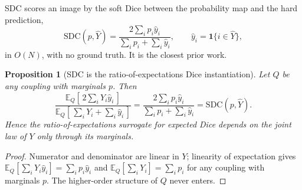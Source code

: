 \documentclass[11pt]{article}
\newtheorem{proposition}{Proposition}
\theoremstyle{remark}
\newcommand{\Yhat}{\widehat{Y}}
\newcommand{\SDC}{\mathrm{SDC}}
\newcommand{\Ex}{\mathbb{E}}
\begin{document}
SDC \cite{sdc} scores an image by the soft Dice between the probability map and the
hard prediction,
\begin{equation}\label{eq:sdc}
\SDC(p,\Yhat) = \frac{2\sum_i p_i \hat{y}_i}{\sum_i p_i + \sum_i \hat{y}_i},
\qquad \hat{y}_i = \mathbf{1}\{i\in\Yhat\},
\end{equation}
in $O(N)$, with no ground truth. It is the closest prior work.

\begin{proposition}[SDC is the ratio-of-expectations Dice instantiation]\label{prop:sdc}
Let $Q$ be \emph{any} coupling with marginals $p$. Then
\begin{equation}
\frac{\Ex_Q[\,2\sum_i Y_i\hat y_i\,]}{\Ex_Q[\,\sum_i Y_i + \sum_i \hat y_i\,]}
= \frac{2\sum_i p_i \hat y_i}{\sum_i p_i + \sum_i \hat y_i} = \SDC(p,\Yhat).
\end{equation}
Hence the ratio-of-expectations surrogate for expected Dice depends on the joint law
of $Y$ only through its marginals.
\end{proposition}
\begin{proof}
Numerator and denominator are linear in $Y$; linearity of expectation gives
$\Ex_Q[\sum_i Y_i\hat y_i]=\sum_i p_i\hat y_i$ and $\Ex_Q[\sum_i Y_i]=\sum_i p_i$
for any coupling with marginals $p$. The higher-order structure of $Q$ never
enters.
\end{proof}
\end{document}
